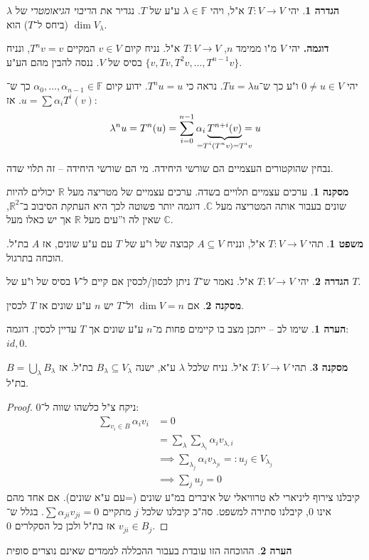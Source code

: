 \documentclass[a4paper]{article}
\newcommand\R     {\mathbb{R}}
\newcommand\C     {\mathbb{C}}
\newcommand\F         {\mathbb{F}}
\newcommand\co        {\colon}
\newcommand\ag        {\alpha}
\renewcommand\lg      {\lambda}
\theoremstyle{definition}
\newtheorem{Theorem}{משפט}
\newtheorem{definition}{הגדרה}
\newtheorem{Remark}{הערה}
\newtheorem{Collary}{מסקנה}
\newcommand\cola [1] {\begin{Collary}#1\end{Collary}}
\newcommand\theo  [1] {\begin{Theorem}#1\end{Theorem}}
\newcommand\defi  [1] {\begin{definition}#1\end{definition}}
\newcommand\rmark [1] {\begin{Remark}#1\end{Remark}}
\begin{document}
	\defi{יהי $T \co V \to V$ א"ל, ויהי $\lg \in \F$ ע"ע של $T$. נגדיר את ה\textit{ריבוי הגיאומטרי} של $\lg$ (ביחס ל־$T$) הוא $\dim V_\lg$. }
	
	\textbf{דוגמה.}
	יהי $V$ מ"ו ממימד $n$, $T \co V \to V$ א"ל. נניח קיום $v \in V $ המקיים $T^nv = v$, ונניח $\{v, Tv, T^2v, \dots, T^{n - 1}v\}$ בסיס של $V$. ננסה להבין מהם הע"ע. 
	
	יהי $0 \neq u \in V$ ו"ע כך ש־$Tu = \lg u$. נראה כי $T^nu = u$. ידוע קיום $\ag_0, \dots, \ag_{n - 1} \in \F$ כך ש־$u = \sum \ag_iT^i(v)$. אז: 
	\[ \lg^nu = T^n(u) = \sum_{i = 0}^{n - 1}\ag_i\underbrace{T^{n + i}(v)}_{\mathclap{= T^i(T^nv) = T^iv}} = u \]
	
	נבחין שהוקטורים העצמיים הם שורשי היחידה. מי הם שורשי היחידה – זה תלוי שדה. 
	
	\cola{ערכים עצמיים תלויים בשדה. ערכים עצמיים של מטריצה מעל $\R$ יכולים להיות שונים בעבור אותה המטריצה מעל $\C$. דוגמה יותר פשוטה לכך היא העתקת הסיבוב ב־$\R^2$, שאין לה ו''עים מעל $\R$ אך יש כאלו מעל $\C$. }
	
	\theo{תהי $T \co V \to V$ א"ל, ונניח $A \subseteq V$ קבוצה של ו"ע של $T$ עם ע"ע שונים, אז $A$ בת"ל. הוכחה בתרגול. }
	
	\defi{יהי $T \co V \to V$ א"ל. נאמר ש־$T$ ניתן לכסון/לכסין אם קיים ל־$V$ בסיס של ו"ע של $T$. }
	
	\cola{אם $\dim V = n$ ול־$T$ יש $n$ ע"ע שונים אז $T$ לכסין. }
	
	\rmark{שימו לב – ייתכן מצב בו קיימים פחות מ־$n$ ע"ע שונים אך $T$ עדיין לכסין. דוגמה: $id, 0$. }
	
	\cola{תהי $T \co V \to V$ א"ל. נניח שלכל $\lg$ ע"א, ישנה $B_\lg \subseteq V_\lg$ בת"ל. אז $B = \bigcup_{\lg}B_\lg$ בת"ל. }
	
	\begin{proof}ניקח צ"ל כלשהו שווה ל־0: 
		\begin{align*}
			\sum_{v_i \in B} \ag_iv_i &= 0 \\
			&= \sum_{\lg}\sum_{\lg_i}\ag_iv_{\lg, i} \\
			&\implies \sum_{\lg_j}\ag_i v_{\lg_{ji}} =: u_j \in V_{\lg_j} \\
			&\implies \sum_{j}u_j = 0
		\end{align*}
		קיבלנו צירוף ליניארי לא טרוויאלי של איברים במ"ע שונים (=עם ע"א שונים). אם אחד מהם אינו 0, קיבלנו סתירה למשפט. סה"כ קיבלנו שלכל $j$ מתקיים $\sum \ag_{ji}v_{ji} = 0$. בגלל ש־$v_{ji} \in B_j$ אז בת"ל ולכן כל הסקלרים 0. 
	\end{proof}
	\rmark{ההוכחה הזו עובדת בעבור ההכללה לממדים שאינם נוצרים סופית}
	
\end{document}
